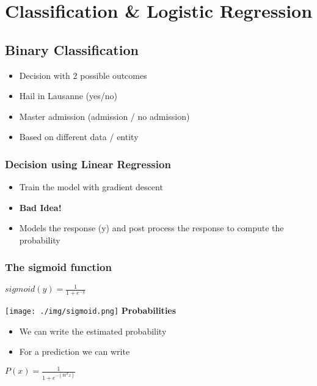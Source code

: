 \section{Classification \& Logistic Regression}
\subsection{Binary Classification}
\begin{itemize}
    \item Decision with 2 possible outcomes
    \item Hail in Lausanne (yes/no)
    \item Master admission (admission / no admission)
    \item Based on different data / entity
\end{itemize}

\subsubsection{Decision using Linear Regression}
\begin{itemize}
    \item Train the model with gradient descent
    \item \textbf{Bad Idea!}
    \item Models the response (y) and post process the response to compute the probability
\end{itemize}

\subsubsection{The sigmoid function}
\begin{center}
    $sigmoid(y) = \frac{1}{1 + e^{-y}}$
\end{center}
\texttt{[image: ./img/sigmoid.png]}
\textbf{Probabilities}
\begin{itemize}
    \item We can write the estimated probability
    \item For a prediction we can write
\end{itemize}
\begin{center}
    $P(x) = \frac{1}{1 + e^{-(W^{T}x)}}$
\end{center}


